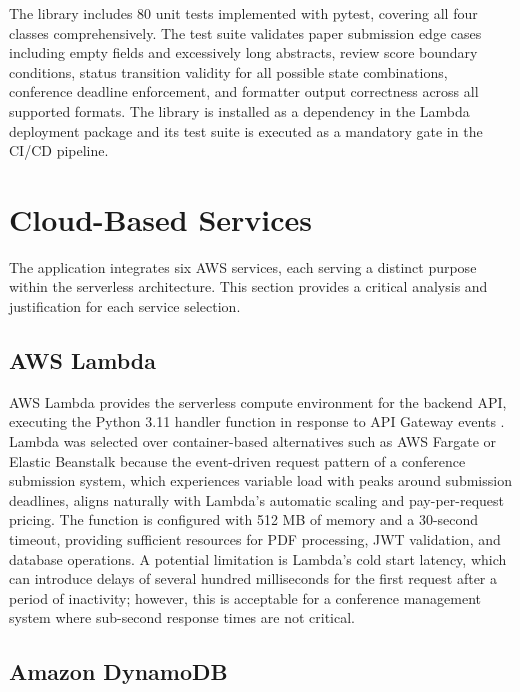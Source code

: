 \documentclass[conference]{IEEEtran}
\begin{document}
The library includes 80 unit tests implemented with pytest, covering all four classes comprehensively. The test suite validates paper submission edge cases including empty fields and excessively long abstracts, review score boundary conditions, status transition validity for all possible state combinations, conference deadline enforcement, and formatter output correctness across all supported formats. The library is installed as a dependency in the Lambda deployment package and its test suite is executed as a mandatory gate in the CI/CD pipeline.

\section{Cloud-Based Services}

The application integrates six AWS services, each serving a distinct purpose within the serverless architecture. This section provides a critical analysis and justification for each service selection.

\subsection{AWS Lambda}

AWS Lambda provides the serverless compute environment for the backend API, executing the Python 3.11 handler function in response to API Gateway events \cite{awslambda}. Lambda was selected over container-based alternatives such as AWS Fargate or Elastic Beanstalk because the event-driven request pattern of a conference submission system, which experiences variable load with peaks around submission deadlines, aligns naturally with Lambda's automatic scaling and pay-per-request pricing. The function is configured with 512 MB of memory and a 30-second timeout, providing sufficient resources for PDF processing, JWT validation, and database operations. A potential limitation is Lambda's cold start latency, which can introduce delays of several hundred milliseconds for the first request after a period of inactivity; however, this is acceptable for a conference management system where sub-second response times are not critical.

\subsection{Amazon DynamoDB}
\end{document}
